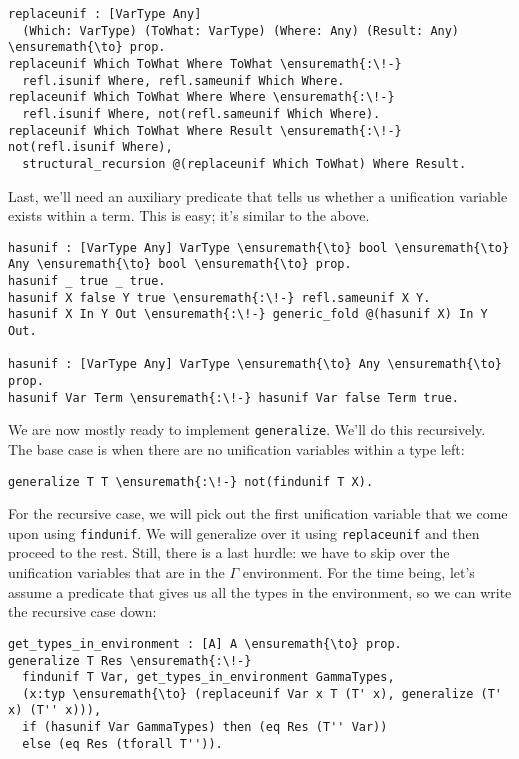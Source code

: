 \begin{verbatim}
replaceunif : [VarType Any]
  (Which: VarType) (ToWhat: VarType) (Where: Any) (Result: Any) \ensuremath{\to} prop.
replaceunif Which ToWhat Where ToWhat \ensuremath{:\!-}
  refl.isunif Where, refl.sameunif Which Where.
replaceunif Which ToWhat Where Where \ensuremath{:\!-}
  refl.isunif Where, not(refl.sameunif Which Where).
replaceunif Which ToWhat Where Result \ensuremath{:\!-} not(refl.isunif Where),
  structural_recursion @(replaceunif Which ToWhat) Where Result.
\end{verbatim}

Last, we'll need an auxiliary predicate that tells us whether a
unification variable exists within a term. This is easy; it's similar to
the above.

\begin{verbatim}
hasunif : [VarType Any] VarType \ensuremath{\to} bool \ensuremath{\to} Any \ensuremath{\to} bool \ensuremath{\to} prop.
hasunif _ true _ true.
hasunif X false Y true \ensuremath{:\!-} refl.sameunif X Y.
hasunif X In Y Out \ensuremath{:\!-} generic_fold @(hasunif X) In Y Out.

hasunif : [VarType Any] VarType \ensuremath{\to} Any \ensuremath{\to} prop.
hasunif Var Term \ensuremath{:\!-} hasunif Var false Term true.
\end{verbatim}

We are now mostly ready to implement \texttt{generalize}. We'll do this
recursively. The base case is when there are no unification variables
within a type left:

\begin{verbatim}
generalize T T \ensuremath{:\!-} not(findunif T X).
\end{verbatim}

For the recursive case, we will pick out the first unification variable
that we come upon using \texttt{findunif}. We will generalize over it
using \texttt{replaceunif} and then proceed to the rest. Still, there is
a last hurdle: we have to skip over the unification variables that are
in the \(\Gamma\) environment. For the time being, let's assume a
predicate that gives us all the types in the environment, so we can
write the recursive case down:

\begin{verbatim}
get_types_in_environment : [A] A \ensuremath{\to} prop.
generalize T Res \ensuremath{:\!-}
  findunif T Var, get_types_in_environment GammaTypes,
  (x:typ \ensuremath{\to} (replaceunif Var x T (T' x), generalize (T' x) (T'' x))),
  if (hasunif Var GammaTypes) then (eq Res (T'' Var))
  else (eq Res (tforall T'')).
\end{verbatim}

